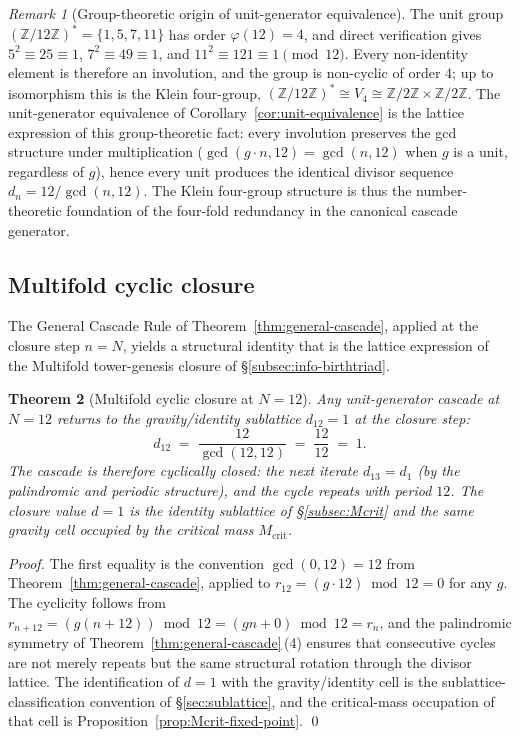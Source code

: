 \documentclass[11pt,a4paper]{article}
\newtheorem{theorem}{Theorem}[section]
\theoremstyle{definition}
\theoremstyle{remark}
\newtheorem{remark}[theorem]{Remark}
\begin{document}
\begin{remark}[Group-theoretic origin of unit-generator equivalence]\label{rem:klein-four}
The unit group $(\mathbb{Z}/12\mathbb{Z})^{*} = \{1,5,7,11\}$ has order $\varphi(12) = 4$, and direct verification gives $5^{2} \equiv 25 \equiv 1$, $7^{2} \equiv 49 \equiv 1$, and $11^{2} \equiv 121 \equiv 1 \pmod{12}$. Every non-identity element is therefore an involution, and the group is non-cyclic of order $4$; up to isomorphism this is the Klein four-group, $(\mathbb{Z}/12\mathbb{Z})^{*} \cong V_{4} \cong \mathbb{Z}/2\mathbb{Z} \times \mathbb{Z}/2\mathbb{Z}$. The unit-generator equivalence of Corollary~\ref{cor:unit-equivalence} is the lattice expression of this group-theoretic fact: every involution preserves the gcd structure under multiplication ($\gcd(g \cdot n, 12) = \gcd(n, 12)$ when $g$ is a unit, regardless of $g$), hence every unit produces the identical divisor sequence $d_{n} = 12/\gcd(n,12)$. The Klein four-group structure is thus the number-theoretic foundation of the four-fold redundancy in the canonical cascade generator.
\end{remark}

\subsection{Multifold cyclic closure}\label{subsec:multifold-closure}

The General Cascade Rule of Theorem~\ref{thm:general-cascade}, applied at the closure step $n = N$, yields a structural identity that is the lattice expression of the Multifold tower-genesis closure of \S\ref{subsec:info-birthtriad}.

\begin{theorem}[Multifold cyclic closure at $N=12$]\label{thm:multifold-closure}
Any unit-generator cascade at $N=12$ returns to the gravity/identity sublattice $d_{12} = 1$ at the closure step:
\[
d_{12} \;=\; \frac{12}{\gcd(12,12)} \;=\; \frac{12}{12} \;=\; 1.
\]
The cascade is therefore cyclically closed: the next iterate $d_{13} = d_{1}$ (by the palindromic and periodic structure), and the cycle repeats with period $12$. The closure value $d=1$ is the identity sublattice of \S\ref{subsec:Mcrit} and the same gravity cell occupied by the critical mass $M_{\mathrm{crit}}$.
\end{theorem}

\begin{proof}
The first equality is the convention $\gcd(0,12) = 12$ from Theorem~\ref{thm:general-cascade}, applied to $r_{12} = (g\cdot 12) \bmod 12 = 0$ for any $g$. The cyclicity follows from $r_{n+12} = (g(n+12)) \bmod 12 = (gn + 0) \bmod 12 = r_{n}$, and the palindromic symmetry of Theorem~\ref{thm:general-cascade}\,(4) ensures that consecutive cycles are not merely repeats but the same structural rotation through the divisor lattice. The identification of $d=1$ with the gravity/identity cell is the sublattice-classification convention of \S\ref{sec:sublattice}, and the critical-mass occupation of that cell is Proposition~\ref{prop:Mcrit-fixed-point}. \qed
\end{proof}
\end{document}

